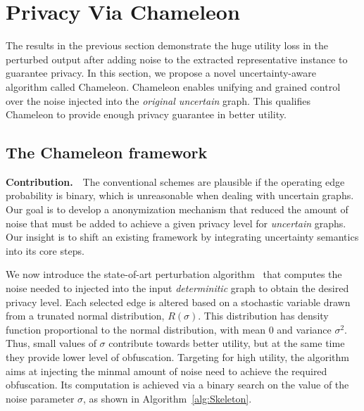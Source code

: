 \section{Privacy Via Chameleon}
\label{sec:tech}
The results in the previous section demonstrate the huge utility loss in the perturbed output after adding noise to the extracted representative instance to guarantee privacy. In this section, we propose a novel uncertainty-aware algorithm called Chameleon. Chameleon enables unifying and grained control over the noise injected into the \emph{original uncertain} graph. This qualifies Chameleon to provide enough privacy guarantee in better utility. 

\subsection{The Chameleon framework}

\textbf{Contribution.}~~The conventional schemes are plausible if the operating edge probability is binary, which is unreasonable when dealing with uncertain graphs. Our goal is to develop a anonymization mechanism that reduced the amount of noise that must be added to achieve a given privacy level for \emph{uncertain} graphs. Our insight is to shift an existing framework by integrating uncertainty semantics into its core steps.

We now introduce the state-of-art perturbation algorithm~\cite{Boldi_Injecting_2012} that computes the noise needed to injected into the input \emph{determinitic} graph to obtain the desired privacy level. Each selected edge is altered based on a stochastic variable drawn from a trunated normal distribution, $R(\sigma)$. This distribution has density function proportional to the normal distribution, with mean $0$ and variance $\sigma^2$. Thus, small values of $\sigma$ contribute towards better utility, but at the same time they provide lower level of obfuscation. Targeting for high utility, the algorithm aims at injecting the minmal amount of noise need to achieve the required obfuscation. Its computation is achieved via a binary search on the value of the noise parameter $\sigma$, as shown in Algorithm~\ref{alg:Skeleton}. 

